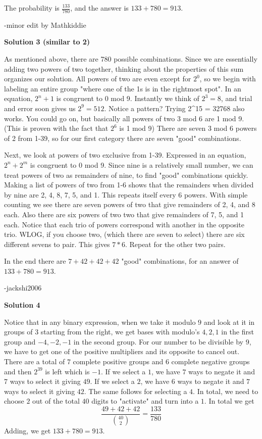 \begin{enumerate}
 The probability is $\frac{133}{780}$, and the answer is $133 + 780 = \boxed{913}$.

 -minor edit by Mathkiddie

 



\textbf{Solution 3 (similar to 2)}

As mentioned above, there are 780 possible combinations. Since we are essentially adding two powers of two together, thinking about the properties of this sum organizes our solution. All powers of two are even except for $2^0$, so we begin with labeling an entire group "where one of the 1s is in the rightmost spot". In an equation, $2^n+1$ is congruent to 0 mod 9. Instantly we think of $2^3=8$, and trial and error soon gives us $2^9=512$. Notice a pattern? Trying 2\textasciicircum{}15 = 32768 also works. You could go on, but basically all powers of two 3 mod 6 are 1 mod 9. (This is proven with the fact that $2^6$ is 1 mod 9) There are seven 3 mod 6 powers of 2 from 1-39, so for our first category there are seven "good" combinations.

 
Next, we look at powers of two exclusive from 1-39. Expressed in an equation, $2^n+2^m$ is congruent to 0 mod 9. Since nine is a relatively small number, we can treat powers of two as remainders of nine, to find "good" combinations quickly. Making a list of powers of two from 1-6 shows that the remainders when divided by nine are 2, 4, 8, 7, 5, and 1. This repeats itself every 6 powers. With simple counting we see there are seven powers of two that give remainders of 2, 4, and 8 each. Also there are six powers of two two that give remainders of 7, 5, and 1 each. Notice that each trio of powers correspond with another in the opposite trio. WLOG, if you choose two, (which there are seven to select) there are six different sevens to pair. This gives $7*6$. Repeat for the other two pairs.

 In the end there are $7+42+42+42$ "good" combinations, for an answer of $133 + 780 = \boxed{913}$.

 
-jackshi2006

 



\textbf{Solution 4}

Notice that in any binary expression, when we take it modulo $9$ and look at it in groups of 3 starting from the right, we get bases with modulo's $4,2,1$ in the first group and $-4,-2,-1$ in the second group. For our number to be divisible by $9$, we have to get one of the positive multipliers and its opposite to cancel out. There are a total of $7$ complete positive groups and $6$ complete negative groups and then $2^{39}$ is left which is $-1$. If we select a $1$, we have $7$ ways to negate it and $7$ ways to select it giving $49$. If we select a $2$, we have $6$ ways to negate it and $7$ ways to select it giving $42$. The same follows for selecting a $4$. In total, we need to choose $2$ out of the total $40$ digits to "activate" and turn into a $1$. In total we get 
 \[\frac{49+42+42}{{40\choose{2}}} = \frac{133}{780}\] Adding, we get $133 + 780 = \boxed{913}$.


\end{enumerate}
